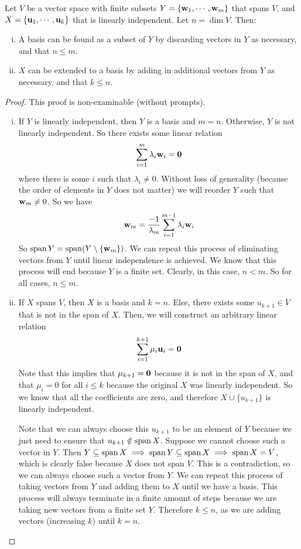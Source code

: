 \documentclass{article}
\begin{document}
\begin{proposition}
	Let $V$ be a vector space with finite subsets $Y = \{ \vb w_1, \cdots, \vb w_m \}$ that spans $V$, and $X = \{ \vb u_1, \cdots, \vb u_k \}$ that is linearly independent. Let $n = \dim V$. Then:
	\begin{enumerate}[(i)]
		\item A basis can be found as a subset of $Y$ by discarding vectors in $Y$ as necessary, and that $n \leq m$.
		\item $X$ can be extended to a basis by adding in additional vectors from $Y$ as necessary, and that $k \leq n$.
	\end{enumerate}
\end{proposition}
\begin{proof}
	This proof is non-examinable (without prompts).
	\begin{enumerate}[(i)]
		\item If $Y$ is linearly independent, then $Y$ is a basis and $m = n$. Otherwise, $Y$ is not linearly independent. So there exists some linear relation
		      \[ \sum_{i=1}^{m} \lambda_i \vb w_i = \vb 0 \]
		      where there is some $i$ such that $\lambda_i \neq 0$. Without loss of generality (because the order of elements in $Y$ does not matter) we will reorder $Y$ such that $\vb w_m \neq 0$. So we have
		      \[ \vb w_m = \frac{-1}{\lambda_m} \sum_{i=1}^{m-1} \lambda_i \vb w_i \]
		      So $\operatorname{span} Y = \operatorname{span} (Y \setminus \{ \vb w_m \})$. We can repeat this process of eliminating vectors from $Y$ until linear independence is achieved. We know that this process will end because $Y$ is a finite set. Clearly, in this case, $n < m$. So for all cases, $n \leq m$.

		\item If $X$ spans $V$, then $X$ is a basis and $k=n$. Else, there exists some $u_{k+1} \in V$ that is not in the span of $X$. Then, we will construct an arbitrary linear relation
		      \[ \sum_{i=1}^{k+1} \mu_i \vb u_i = \vb 0 \]
		      Note that this implies that $\mu_{k+1} = \vb 0$ because it is not in the span of $X$, and that $\mu_i = 0$ for all $i \leq k$ because the original $X$ was linearly independent. So we know that all the coefficients are zero, and therefore $X \cup \{ u_{k+1} \}$ is linearly independent.

		      Note that we can always choose this $u_{k+1}$ to be an element of $Y$ because we just need to ensure that $u_{k+1} \notin \operatorname{span} X$. Suppose we cannot choose such a vector in $Y$. Then $Y \subseteq \operatorname{span} X \implies \operatorname{span} Y \subseteq \operatorname{span} X \implies \operatorname{span} X = V$, which is clearly false because $X$ does not span $V$. This is a contradiction, so we can always choose such a vector from $Y$. We can repeat this process of taking vectors from $Y$ and adding them to $X$ until we have a basis. This process will always terminate in a finite amount of steps because we are taking new vectors from a finite set $Y$. Therefore $k \leq n$, as we are adding vectors (increasing $k$) until $k=n$.
	\end{enumerate}
\end{proof}
\end{document}
